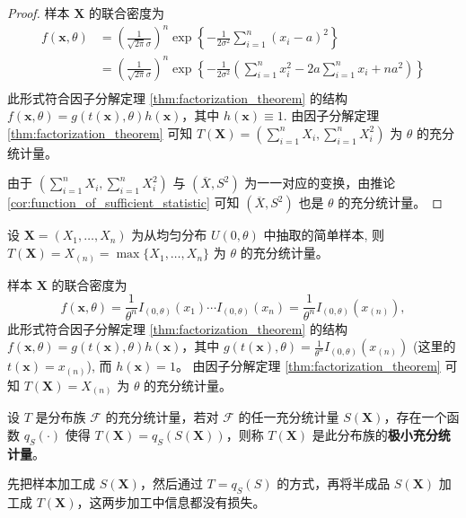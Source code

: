\begin{proof}
样本 $\boldsymbol{X}$ 的联合密度为
\begin{align*}
f(\boldsymbol{x},\theta) &= \left(\frac{1}{\sqrt{2\pi}\sigma}\right)^n \exp\left\{-\frac{1}{2\sigma^2}\sum_{i=1}^n (x_i-a)^2\right\} \\
&= \left(\frac{1}{\sqrt{2\pi}\sigma}\right)^n \exp\left\{-\frac{1}{2\sigma^2}\left(\sum_{i=1}^n x_i^2 - 2a\sum_{i=1}^n x_i + na^2\right)\right\} \\
\end{align*}
此形式符合因子分解定理 \ref{thm:factorization_theorem} 的结构 $f(\boldsymbol{x},\theta) = g(t(\boldsymbol{x}),\theta)h(\boldsymbol{x})$，其中
$h(\boldsymbol{x}) \equiv 1$.
由因子分解定理 \ref{thm:factorization_theorem} 可知 $T(\boldsymbol{X}) = \left(\sum_{i=1}^n X_i, \sum_{i=1}^n X_i^2\right)$ 为 $\theta$ 的充分统计量。

由于 $\left(\sum_{i=1}^n X_i, \sum_{i=1}^n X_i^2\right)$ 与 $(\overline{X}, S^2)$ 为一一对应的变换，由推论 \ref{cor:function_of_sufficient_statistic} 可知 $(\overline{X}, S^2)$ 也是 $\theta$ 的充分统计量。
\end{proof}

\begin{example}\label{ex:uniform_max_sufficient}
设 $\boldsymbol{X} = (X_1, \ldots, X_n)$ 为从均匀分布 $U(0,\theta)$ 中抽取的简单样本, 则 $T(\boldsymbol{X}) = X_{(n)} = \max\{X_1, \ldots, X_n\}$ 为 $\theta$ 的充分统计量。

样本 $\boldsymbol{X}$ 的联合密度为
\[
f(\boldsymbol{x},\theta) = \frac{1}{\theta^n}I_{(0,\theta)}(x_1) \cdots I_{(0,\theta)}(x_n) = \frac{1}{\theta^n} I_{(0,\theta)}(x_{(n)}),
\]
此形式符合因子分解定理 \ref{thm:factorization_theorem} 的结构 $f(\boldsymbol{x},\theta) = g(t(\boldsymbol{x}),\theta)h(\boldsymbol{x})$，其中
$g(t(\boldsymbol{x}),\theta) = \frac{1}{\theta^n} I_{(0,\theta)}(x_{(n)})$ (这里的 $t(\boldsymbol{x}) = x_{(n)}$),
而 $h(\boldsymbol{x}) = 1$。
由因子分解定理 \ref{thm:factorization_theorem} 可知 $T(\boldsymbol{X}) = X_{(n)}$ 为 $\theta$ 的充分统计量。
\end{example}

\begin{definition}[极小充分统计量] \label{def:minimal_sufficient_statistic}
设 $T$ 是分布族 $\mathcal{F}$ 的充分统计量，若对 $\mathcal{F}$ 的任一充分统计量 $S(\boldsymbol{X})$，存在一个函数 $q_S(\cdot)$ 使得 $T(\boldsymbol{X}) = q_S(S(\boldsymbol{X}))$，则称 $T(\boldsymbol{X})$ 是此分布族的\textbf{极小充分统计量}。
\end{definition}
\begin{remark}
    先把样本加工成 $S(\boldsymbol{X})$，然后通过 $T = q_S(S)$ 的方式，再将半成品 $S(\boldsymbol{X})$ 加工成 $T(\boldsymbol{X})$，这两步加工中信息都没有损失。
\end{remark}

